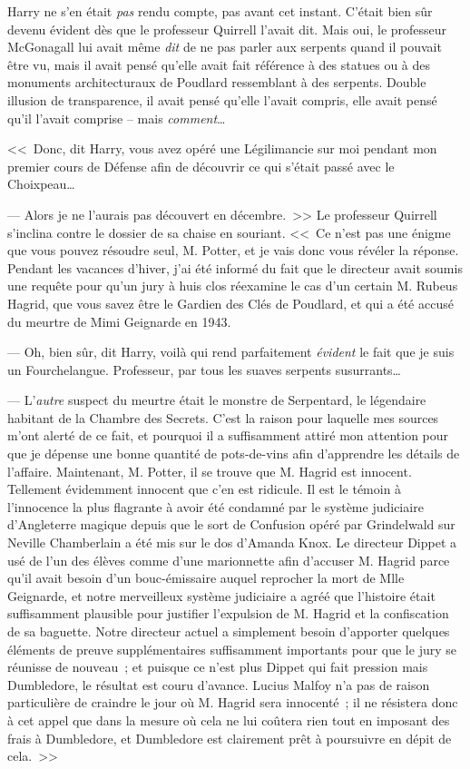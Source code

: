 Harry ne s'en était \emph{pas} rendu compte, pas avant cet instant. C'était bien sûr devenu évident dès que le professeur Quirrell l'avait dit. Mais oui, le professeur McGonagall lui avait même \emph{dit} de ne pas parler aux serpents quand il pouvait être vu, mais il avait pensé qu'elle avait fait référence à des statues ou à des monuments architecturaux de Poudlard ressemblant à des serpents. Double illusion de transparence, il avait pensé qu'elle l'avait compris, elle avait pensé qu'il l'avait comprise -- mais \emph{comment}…

<<~Donc, dit Harry, vous avez opéré une Légilimancie sur moi pendant mon premier cours de Défense afin de découvrir ce qui s'était passé avec le Choixpeau…

--- Alors je ne l'aurais pas découvert en décembre.~>> Le professeur Quirrell s'inclina contre le dossier de sa chaise en souriant. <<~Ce n'est pas une énigme que vous pouvez résoudre seul, M. Potter, et je vais donc vous révéler la réponse. Pendant les vacances d'hiver, j'ai été informé du fait que le directeur avait soumis une requête pour qu'un jury à huis clos réexamine le cas d'un certain M. Rubeus Hagrid, que vous savez être le Gardien des Clés de Poudlard, et qui a été accusé du meurtre de Mimi Geignarde en 1943.

--- Oh, bien sûr, dit Harry, voilà qui rend parfaitement \emph{évident} le fait que je suis un Fourchelangue. Professeur, par tous les suaves serpents susurrants…

--- L'\emph{autre} suspect du meurtre était le monstre de Serpentard, le légendaire habitant de la Chambre des Secrets. C'est la raison pour laquelle mes sources m'ont alerté de ce fait, et pourquoi il a suffisamment attiré mon attention pour que je dépense une bonne quantité de pots-de-vins afin d'apprendre les détails de l'affaire. Maintenant, M. Potter, il se trouve que M. Hagrid est innocent. Tellement évidemment innocent que c'en est ridicule. Il est le témoin à l'innocence la plus flagrante à avoir été condamné par le système judiciaire d'Angleterre magique depuis que le sort de Confusion opéré par Grindelwald sur Neville Chamberlain a été mis sur le dos d'Amanda Knox. Le directeur Dippet a usé de l'un des élèves comme d'une marionnette afin d'accuser M. Hagrid parce qu'il avait besoin d'un bouc-émissaire auquel reprocher la mort de Mlle Geignarde, et notre merveilleux système judiciaire a agréé que l'histoire était suffisamment plausible pour justifier l'expulsion de M. Hagrid et la confiscation de sa baguette. Notre directeur actuel a simplement besoin d'apporter quelques éléments de preuve supplémentaires suffisamment importants pour que le jury se réunisse de nouveau~; et puisque ce n'est plus Dippet qui fait pression mais Dumbledore, le résultat est couru d'avance. Lucius Malfoy n'a pas de raison particulière de craindre le jour où M. Hagrid sera innocenté~; il ne résistera donc à cet appel que dans la mesure où cela ne lui coûtera rien tout en imposant des frais à Dumbledore, et Dumbledore est clairement prêt à poursuivre en dépit de cela.~>>

